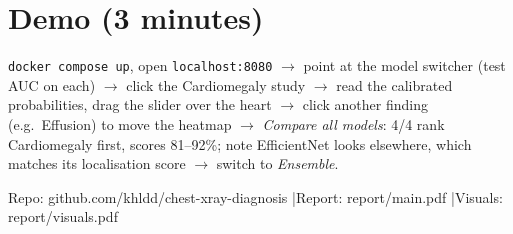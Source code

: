 \documentclass[11pt,a4paper]{article}
\begin{document}
\section*{Demo (3 minutes)}
\texttt{docker compose up}, open \texttt{localhost:8080} $\to$ point at the model switcher (test AUC on each) $\to$ click the Cardiomegaly study $\to$ read the calibrated probabilities, drag the slider over the heart $\to$ click another finding (e.g.\ Effusion) to move the heatmap $\to$ \emph{Compare all models}: 4/4 rank Cardiomegaly first, scores 81--92\%; note EfficientNet looks elsewhere, which matches its localisation score $\to$ switch to \emph{Ensemble}.

\vfill
{\footnotesize Repo: github.com/khldd/chest-xray-diagnosis \quad|\quad Report: report/main.pdf \quad|\quad Visuals: report/visuals.pdf}
\end{document}
